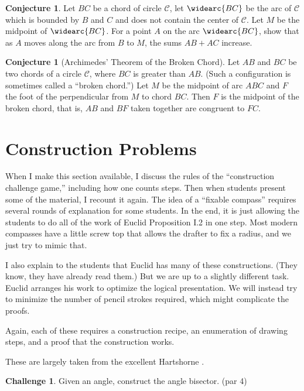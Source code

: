 \documentclass{tufte-handout}
\theoremstyle{definition}
\newtheorem{conjecture}[problem]{Conjecture}
\newtheorem{challenge}[problem]{Challenge}
\begin{document}
\begin{conjecture}
Let $BC$ be a chord of circle $\mathcal{C}$, let $\widearc{BC}$ be the arc of $\mathcal{C}$ which is bounded by $B$ and $C$ and does not contain the center of $\mathcal{C}$.
Let $M$ be the midpoint of $\widearc{BC}$.
For a point $A$ on the arc $\widearc{BC}$, show that as $A$ moves along the arc from $B$ to $M$, the sums $AB+AC$ increase.
\end{conjecture}


\begin{conjecture}[Archimedes' Theorem of the Broken Chord] Let $AB$ and $BC$ be two chords of a circle $\mathcal{C}$, where $BC$ is greater than $AB$.
(Such a configuration is sometimes called a ``broken chord.'')
Let $M$ be the midpoint of arc ${ABC}$ and $F$ the foot of the perpendicular from $M$ to chord $BC$.
Then $F$ is the midpoint of the broken chord, that is, $AB$ and $BF$ taken together are congruent to $FC$.
\end{conjecture}

\clearpage
\setcounter{section}{11}
\setcounter{problem}{0}
\section{Construction Problems}

When I make this section available, I discuss the rules of the ``construction challenge game,'' including how one counts steps. Then when students present some of the material, I recount it again. The idea of a ``fixable compass'' requires several rounds of explanation for some students. In the end, it is just allowing the students to do all of the work of Euclid Proposition I.2 in one step. Most modern compasses have a little screw top that allows the drafter to fix a radius, and we just try to mimic that.

I also explain to the students that Euclid has many of these constructions. (They know, they have already read them.) But we are up to a slightly different task. Euclid arranges his work to optimize the logical presentation. We will instead try to minimize the number of pencil strokes required, which might complicate the proofs.

Again, each of these requires a construction recipe, an enumeration of drawing steps, and a proof that the construction works. 

These are largely taken from the excellent Hartshorne \cite{Hartshorne}.

\begin{challenge}\label{chal:angle-bisector}
Given an angle, construct the angle bisector. (par 4)
\end{challenge}
\end{document}
